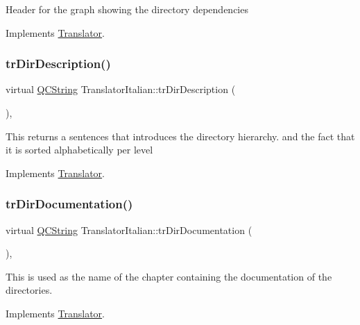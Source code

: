 Header for the graph showing the directory dependencies 

Implements \mbox{\hyperlink{class_translator}{Translator}}.

\mbox{\label{class_translator_italian_a6975756ad0c915166e8ae3b10406c65f}} 
\subsubsection{\texorpdfstring{trDirDescription()}{trDirDescription()}}
{\footnotesize\ttfamily virtual \mbox{\hyperlink{class_q_c_string}{Q\+C\+String}} Translator\+Italian\+::tr\+Dir\+Description (\begin{DoxyParamCaption}{ }\end{DoxyParamCaption})\hspace{0.3cm}{\ttfamily [inline]}, {\ttfamily [virtual]}}

This returns a sentences that introduces the directory hierarchy. and the fact that it is sorted alphabetically per level 

Implements \mbox{\hyperlink{class_translator}{Translator}}.

\mbox{\label{class_translator_italian_a9971144c072666795909e3b0bcfcb428}} 
\subsubsection{\texorpdfstring{trDirDocumentation()}{trDirDocumentation()}}
{\footnotesize\ttfamily virtual \mbox{\hyperlink{class_q_c_string}{Q\+C\+String}} Translator\+Italian\+::tr\+Dir\+Documentation (\begin{DoxyParamCaption}{ }\end{DoxyParamCaption})\hspace{0.3cm}{\ttfamily [inline]}, {\ttfamily [virtual]}}

This is used as the name of the chapter containing the documentation of the directories. 

Implements \mbox{\hyperlink{class_translator}{Translator}}.

\mbox{\label{class_translator_italian_a04426c318141a14fadc21657a8a40e43}} 
